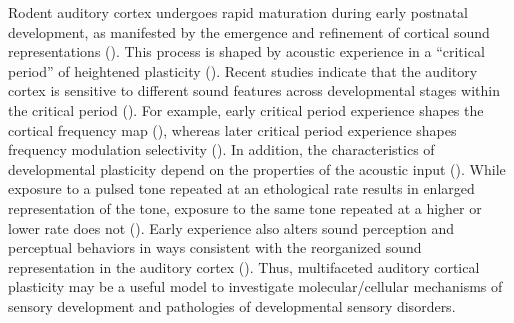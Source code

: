 Rodent auditory cortex undergoes rapid maturation during early postnatal development, as manifested by the emergence and refinement of cortical sound representations (\cite{Zhang2001, Chang2005, DeVillers-Sidani2007, Insanally2009}). This process is shaped by acoustic experience in a “critical period” of heightened plasticity (\cite{DeVillers-Sidani2007}). Recent studies indicate that the auditory cortex is sensitive to different sound features across developmental stages within the critical period (\cite{Insanally2009, Popescu2010}). For example, early critical period experience shapes the cortical frequency map (\cite{DeVillers-Sidani2007, Insanally2009}), whereas later critical period experience shapes frequency modulation selectivity (\cite{Insanally2009, Insanally2010}). In addition, the characteristics of developmental plasticity depend on the properties of the acoustic input (\cite{Chang2003, Zhou2008}). While exposure to a pulsed tone repeated at an ethological rate results in enlarged representation of the tone, exposure to the same tone repeated at a higher or lower rate does not (\cite{Kim2009}). Early experience also alters sound perception and perceptual behaviors in ways consistent with the reorganized sound representation in the auditory cortex (\cite{Han2007}). Thus, multifaceted auditory cortical plasticity may be a useful model to investigate molecular/cellular mechanisms of sensory development and pathologies of developmental sensory disorders.


